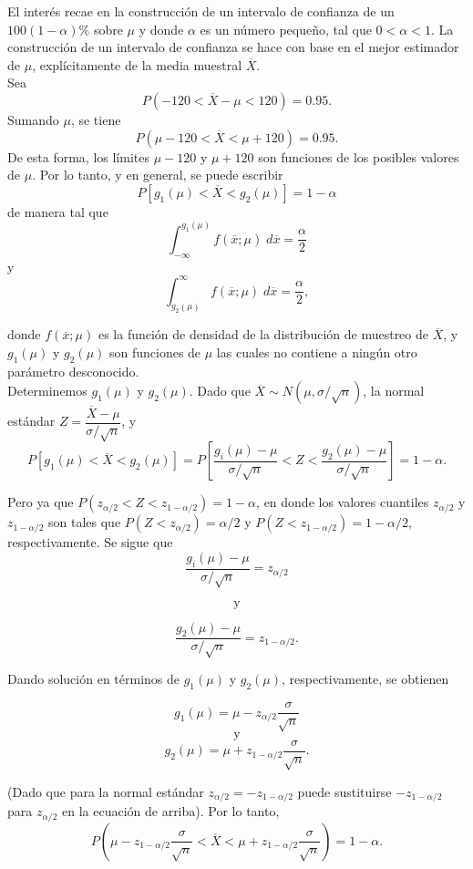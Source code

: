 El interés recae en la construcción de un intervalo de confianza de un $100(1-\alpha)\%$ sobre $\mu$ y donde $\alpha$ es un número pequeño, tal que $0<\alpha<1$. La construcción de un intervalo de confianza se hace con base en el mejor estimador de $\mu$, explícitamente de la media muestral $\overline{X}$.\\

Sea 
$$P(-120<\overline{X}-\mu<120)=0.95.$$
Sumando $\mu$, se tiene
$$P(\mu-120<\overline{X}<\mu+120)=0.95.$$
De esta forma, los límites $\mu-120$ y $\mu+120$ son funciones de los posibles valores de $\mu$. Por lo tanto, y en general, se puede escribir
$$P\left[g_1(\mu)<\overline{X}<g_2(\mu)\right]=1-\alpha$$
de manera tal que
$$\int_{-\infty}^{g_1(\mu)}f(\overline{x};\mu)\; d\overline{x}=\dfrac{\alpha}{2}$$
y
$$\int^{\infty}_{g_2(\mu)}f(\overline{x};\mu)\; d\overline{x}=\dfrac{\alpha}{2},$$

donde $f(\overline{x};\mu)$ es la función de densidad de la distribución de muestreo de $\overline{X}$, y $g_1(\mu)$ y $g_2(\mu)$ son funciones de $\mu$ las cuales no contiene a ningún otro parámetro desconocido.\\

Determinemos $g_1(\mu)$ y $g_2(\mu)$. Dado que $\overline{X}\sim N(\mu,\sigma/\sqrt{n})$, la normal estándar $Z=\dfrac{\overline{X}-\mu}{\sigma/\sqrt{n}}$, y 
$$P\left[g_1(\mu)<\overline{X}<g_2(\mu)\right]=P\left[\dfrac{g_i(\mu)-\mu}{\sigma/\sqrt{n}}<Z<\dfrac{g_2(\mu)-\mu}{\sigma/\sqrt{n}}\right]=1-\alpha.$$

Pero ya que $P\left(z_{\alpha/2}<Z<z_{1-\alpha/2}\right)=1-\alpha$, en donde los valores cuantiles $z_{\alpha/2}$ y $z_{1-\alpha/2}$ son tales que $P(Z<z_{\alpha/2})=\alpha/2$ y $P(Z<z_{1-\alpha/2})=1-\alpha/2$, respectivamente. Se sigue que
$$\dfrac{g_i(\mu)-\mu}{\sigma/\sqrt{n}}=z_{\alpha/2}$$

$$\mbox{y}$$ 

$$\dfrac{g_2(\mu)-\mu}{\sigma/\sqrt{n}}=z_{1-\alpha/2}.$$

Dando solución en términos de $g_1(\mu)$ y $g_2(\mu)$, respectivamente, se obtienen

$$g_1(\mu)=\mu-z_{\alpha/2}\dfrac{\sigma}{\sqrt{n}}$$
$$\mbox{y}$$
$$g_2(\mu)=\mu+z_{1-\alpha/2}\dfrac{\sigma}{\sqrt{n}}.$$

(Dado que para la normal estándar $z_{\alpha/2}=-z_{1-\alpha/2}$ puede sustituirse $-z_{1-\alpha/2}$ para $z_{\alpha/2}$ en la ecuación de arriba). Por lo tanto,
$$P\left(\mu-z_{1-\alpha/2}\dfrac{\sigma}{\sqrt{n}}<\overline{X}<\mu+z_{1-\alpha/2}\dfrac{\sigma}{\sqrt{n}}\right)=1-\alpha.$$

